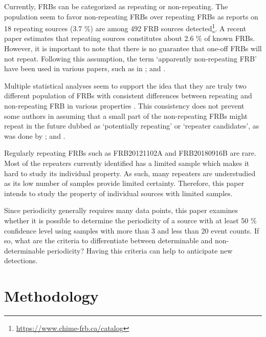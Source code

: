 \documentclass[reprint,amsmath,amssymb,showkeys,prd]{revtex4-2}
\begin{document}
Currently, FRBs can be categorized as repeating or non-repeating.
The population seem to favor non-repeating FRBs over repeating FRBs as \cite{thechimefrbcollaborationCHIMEFastRadio2018} reports on 18 repeating sources (3.7 \%) are among 492 FRB sources detected\footnote{\url{https://www.chime-frb.ca/catalog}}.
A recent paper  \cite{andersen_CHIMEFRBDiscovery_2023}  estimates that repeating sources constitutes about 2.6 \% of known FRBs.
However, it is important to note that there is no guarantee that one-off FRBs will not repeat.
Following this assumption, the term `apparently non-repeating FRB' have been used in various papers, such as in \citet{cui_FastRadioBursts_2021, cui_StatisticalPropertiesFast_2021}; and \citet{katz_AbsencePeriodicityRepeating_2022}.

Multiple statistical analyses seem to support the idea that they are truly two different population of FRBs with consistent differences between repeating and non-repeating FRB in various properties \cite{cui_FastRadioBursts_2021, chen_OneoffRepeatingFast_2022, zhang_StatisticalSimilarityRepeating_2022} .
This consistency does not prevent some authors in assuming that a small part of the non-repeating FRBs might repeat in the future dubbed as `potentially repeating' or `repeater candidates', as was done by \citet{bohanchen_UncloakingHiddenRepeating_2021, luo_MachineLearningClassification_2022, zhu-ge_MachineLearningClassification_2022}; and \citet{pleunis_FastRadioBurst_2021}.

Regularly repeating FRBs such as FRB20121102A and FRB20180916B are rare.
Most of the repeaters currently identified has a limited sample which makes it hard to study its individual property.
As such, many repeaters are understudied as its low number of samples provide limited certainty.
Therefore, this paper intends to study the property of individual sources with limited samples.

Since periodicity generally requires many data points, this paper examines whether it is possible to determine the periodicity of a source with at least 50 \% confidence level using samples with more than 3 and less than 20 event counts.
If so, what are the criteria to differentiate between determinable and non-determinable periodicity?
Having this criteria can help to anticipate new detections.

\section{Methodology}
\end{document}
